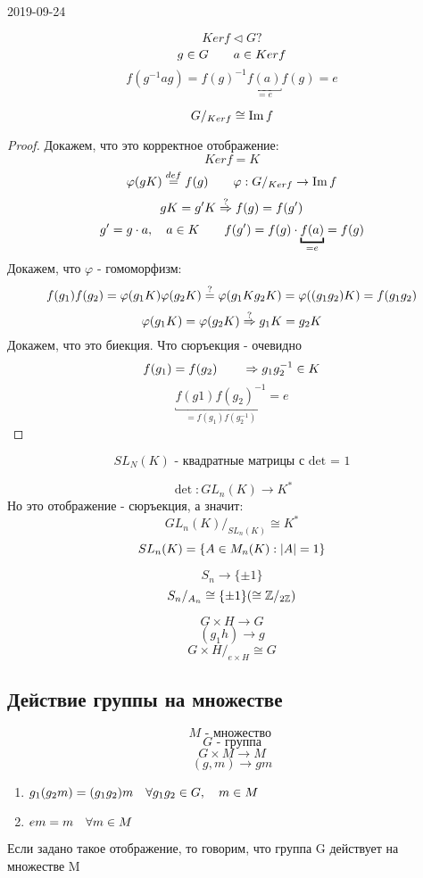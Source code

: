 \documentclass[12pt, fleqn]{article}
\begin{document}
\begin{lect} {2019-09-24}
	\begin{Proof}
	    \[Ker f \triangleleft G ?\]
		\[g \in G \quad\quad a \in Ker f\]
		\[f(g^{-1} a g) = f(g)^{-1} \underbracket{f(a)}_{= e} f(g) = e\]
	\end{Proof}

	\begin{Utv} 
			\[G/_{Ker f} \cong \mathop{\rm Im}\nolimits f \]
	\end{Utv}
	\begin{proof}
    	Докажем, что это корректное отображение:
			\[Ker f = K\]
			\[\varphi(gK) \overset{def}{=} f(g) \quad\quad \varphi: G/_{Ker f} \to \mathop{\rm Im}\nolimits f\]
			\[gK = g'K \overset{?}{\Rightarrow} f(g) = f(g')\]
			\[g' = g \cdot a, \q a \in K \q\q f(g') = f(g) \cdot \underbracket{f(a)}_{= e} = f(g) \]
    	Докажем, что $\varphi$ - гомоморфизм:
			\[f(g_1)f(g_2) = \varphi(g_1K) \varphi(g_2K) \overset{?}{=} \varphi(g_1 K g_2 K) = \varphi((g_1g_2)K) =
			f(g_1g_2)\]
			\[\varphi(g_1K) = \varphi(g_2K) \overset{?}{\Rightarrow} g_1K = g_2 K\]
      Докажем, что это биекция. Что сюръекция - очевидно
			\[f(g_1) = f(g_2) \quad\quad \Rightarrow g_1 g_2^{-1} \in K \]
			\[\underbracket{f(g1)f(g_2)^{-1}}_{= f(g_1)f(g_2^{-1})}  = e \]
	\end{proof}

	\begin{Reminder}
		\[SL_N(K) \text{ - квадратные матрицы с det = 1}\]
	\end{Reminder}

	\begin{Definition}
		\[\det: GL_n(K) \to K^*\]
    Но это отображение - сюръекция, а значит:
		\[GL_n(K) / _{SL_n(K)} \cong K^*\]
		\[SL_n(K) = \{A \in M_n(K) : \left|A\right| = 1\}\]
	\end{Definition}

	\begin{Example}[1]
			\[S_n \to \{\pm 1\}\]
			\[S_n / _{A_n} \cong \{\pm 1\} (\cong \mathbb{Z}/_{2\mathbb{Z}} ) \]
	\end{Example}

	\begin{Example}[2]
		\[G \times H \to G\]
		\[(g_1 h) \to g\]
		\[G \times H /_{e \times H} \cong G\]
	\end{Example}

	\subsection{Действие группы на множестве}
	\begin{Definition}
		\[M \text{ - множество } \]
		\[G \text{ - группа}\]
		\[G \times M \to  M\]
		\[(g, m) \to gm\]
		\begin{enumerate}
			\item $g_1(g_2m) = (g_1g_2)m \quad \forall g_1 g_2 \in G, \quad m \in M$
			\item $em = m \quad \forall m \in  M$
		\end{enumerate}
		Если задано такое отображение, то говорим, что группа G действует на множестве M
	\end{Definition}


\end{lect}
\end{document}
